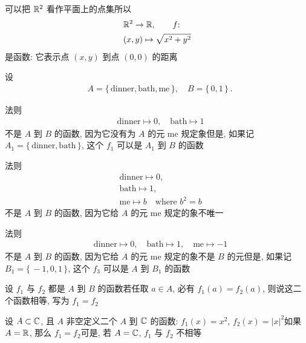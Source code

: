 \begin{example}
    可以把 $\mathbb{R}^2$ 看作平面上的点集\period 所以
    \begin{align*}
         & \mathbb{R}^2 \to \mathbb{R},  \tag*{$f$:}  \\
         & (x,y) \mapsto \sqrt{x^2+y^2}
    \end{align*}
    是函数: 它表示点 $(x,y)$ 到点 $(0,0)$ 的距离\period
\end{example}

\begin{example}
    设
    \begin{align*}
         & A = \{\, \text{dinner}, \text{bath}, \text{me} \,\}, \quad B = \{\, 0,1 \,\} \period
    \end{align*}

    法则
    \begin{align*}
         & \text{dinner} \mapsto 0, \quad \text{bath} \mapsto 1 \tag*{$f_1$:}
    \end{align*}
    不是 $A$ 到 $B$ 的函数, 因为它没有为 $A$ 的元 $\text{me}$ 规定象\period 但是, 如果记 $A_1 = \{\, \text{dinner}, \text{bath} \,\}$, 这个 $f_1$ 可以是 $A_1$ 到 $B$ 的函数\period

    法则
    \begin{align*}
         & \text{dinner} \mapsto 0, \tag*{$f_2$:}          \\
         & \text{bath} \mapsto 1,                          \\
         & \text{me} \mapsto b \quad \text{where } b^2 = b
    \end{align*}
    不是 $A$ 到 $B$ 的函数, 因为它给 $A$ 的元 $\text{me}$ 规定的象不唯一\period

    法则
    \begin{align*}
         & \text{dinner} \mapsto 0, \quad
        \text{bath} \mapsto 1, \quad
        \text{me} \mapsto -1 \tag*{$f_3$:}
    \end{align*}
    不是 $A$ 到 $B$ 的函数, 因为它给 $A$ 的元 $\text{me}$ 规定的象不是 $B$ 的元\period 但是, 如果记 $B_1 = \{\, -1,0,1 \,\}$, 这个 $f_3$ 可以是 $A$ 到 $B_1$ 的函数\period
\end{example}

\begin{definition}
    设 $f_1$ 与 $f_2$ 都是 $A$ 到 $B$ 的函数\period 若任取 $a \in A$, 必有 $f_1 (a) = f_2 (a)$, 则说这二个函数相等, 写为 $f_1 = f_2$\period
\end{definition}

\begin{example}
    设 $A \subset \mathbb{C}$, 且 $A$ 非空\period 定义二个 $A$ 到 $\mathbb{C}$ 的函数: $f_1 (x) = x^2$, $f_2 (x) = |x|^2$\period 如果 $A = \mathbb{R}$, 那么 $f_1 = f_2$\period 可是, 若 $A = \mathbb{C}$, $f_1$ 与 $f_2$ 不相等\period
\end{example}

